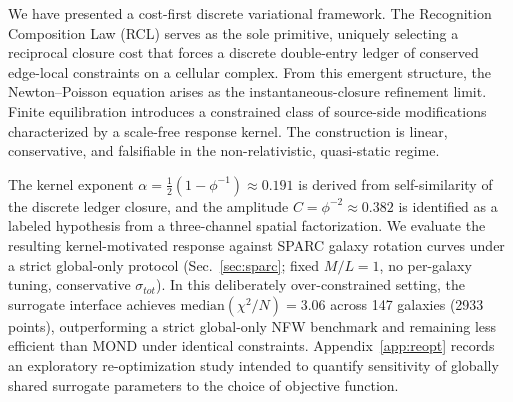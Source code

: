 \documentclass[entropy,article,submit,pdftex,moreauthors]{Definitions/mdpi}
\begin{document}
We have presented a cost-first discrete variational framework. The Recognition Composition Law (RCL) serves as the sole primitive, uniquely selecting a reciprocal closure cost that forces a discrete double-entry ledger of conserved edge-local constraints on a cellular complex. From this emergent structure, the Newton--Poisson equation arises as the instantaneous-closure refinement limit. Finite equilibration introduces a constrained class of source-side modifications characterized by a scale-free response kernel. The construction is linear, conservative, and falsifiable in the non-relativistic, quasi-static regime.

The kernel exponent $\alpha = \frac{1}{2}(1-\phi^{-1}) \approx 0.191$ is derived from self-similarity of the discrete ledger closure, and the amplitude $C = \phi^{-2} \approx 0.382$ is identified as a labeled hypothesis from a three-channel spatial factorization. We evaluate the resulting kernel-motivated response against SPARC galaxy rotation curves under a strict global-only protocol (Sec.~\ref{sec:sparc}; fixed 
$M/L=1$, no per-galaxy tuning, conservative $\sigma_{tot}$). In this deliberately over-constrained setting, the surrogate interface achieves $\textrm{median}(\chi^2/N) = 3.06$ across 147 galaxies (2933 points), outperforming a strict global-only NFW benchmark and remaining less efficient than MOND under identical constraints. Appendix~\ref{app:reopt} records an exploratory re-optimization study intended to quantify sensitivity of globally shared surrogate parameters to the choice of objective function.


\end{document}
